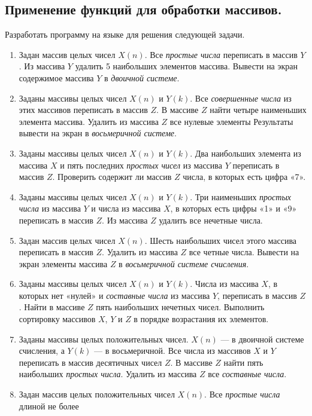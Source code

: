 \subsection[Применение функций для обработки массивов.]{Применение функций для обработки массивов.}
Разработать программу на языке  для решения следующей задачи.

\begin{enumerate}
\item Задан массив целых чисел $X(n)$. Все \emph{простые числа} переписать в массив
$Y$. Из массива $Y$ удалить 5 наибольших элементов массива. Вывести на экран содержимое массива
$Y$ в \emph{двоичной системе}.
\item Заданы массивы целых чисел $X(n)$ и $Y(k)$. Все
\emph{совершенные числа} из этих массивов переписать в массив $Z$. В массиве
$Z$ найти четыре наименьших элемента массива. Удалить из массива $Z$ все нулевые
элементы Результаты вывести на экран в \emph{восьмеричной системе}. 
\item Заданы массивы целых чисел $X(n)$ и $Y(k)$. Два наибольших
элемента из массива $X$ и пять последних \emph{простых чисел} из массива
$Y$ переписать в массив $Z$. Проверить содержит ли массив $Z$ числа, в
которых есть цифра «7».
\item Заданы массивы целых чисел $X(n)$ и $Y(k)$. Три наименьших
\emph{простых числа} из массива $Y$ и числа из массива $X$, в которых есть цифры «1»
и «9» переписать в массив $Z$. Из  массива $Z$ удалить все нечетные числа.
\item Задан массив целых чисел $X(n)$. Шесть наибольших чисел этого массива переписать в массив
$Z$. Удалить из массива $Z$ все четные числа. Вывести на экран элементы массива
$Z$ в \emph{восьмеричной системе счисления}.
\item Заданы массивы целых чисел $X(n)$ и $Y(k)$. Числа из массива
$X$, в которых нет «нулей» и \emph{составные числа} из массива $Y$, переписать в массив
$Z$. Найти в массиве $Z$ пять наибольших нечетных чисел. Выполнить сортировку массивов $X$,
$Y$ и $Z$ в порядке возрастания их элементов.
\item Заданы массивы целых положительных чисел. $X(n)$ --- в двоичной системе счисления, а 
$Y(k)$ --- в восьмеричной. Все числа из массивов $X$ и $Y$
переписать в массив десятичных чисел $Z$. В массиве $Z$ найти пять наибольших
\emph{простых числа}. Удалить из массива $Z$ все \emph{составные числа}.
\item Задан массив целых положительных чисел $X(n)$. Все \emph{простые числа} длиной не более

\end{enumerate}
